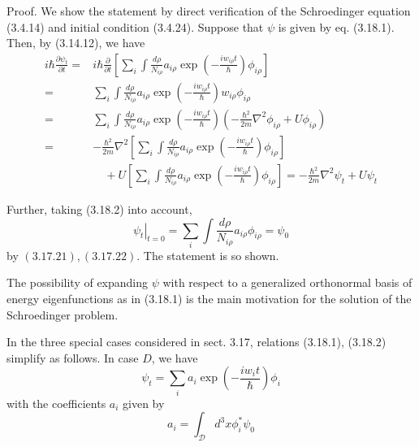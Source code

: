 \documentclass{article}
\begin{document}
Proof. We show the statement by direct verification of the Schroedinger equation (3.4.14) and initial condition (3.4.24). Suppose that $\psi$ is given by eq. (3.18.1). Then, by (3.14.12), we have
$$
\begin{align*}
i \hbar \frac{\partial \psi_{t}}{\partial t}= & i \hbar \frac{\partial}{\partial t}\left[\sum_{i} \int \frac{d \rho}{N_{i \rho}} a_{i \rho} \exp \left(-\frac{i w_{i \rho} t}{\hbar}\right) \phi_{i \rho}\right]  \tag{3.18.3}\\
= & \sum_{i} \int \frac{d \rho}{N_{i \rho}} a_{i \rho} \exp \left(-\frac{i w_{i \rho} t}{\hbar}\right) w_{i \rho} \phi_{i \rho} \\
= & \sum_{i} \int \frac{d \rho}{N_{i \rho}} a_{i \rho} \exp \left(-\frac{i w_{i \rho} t}{\hbar}\right)\left(-\frac{\hbar^{2}}{2 m} \nabla^{2} \phi_{i \rho}+U \phi_{i \rho}\right) \\
= & -\frac{\hbar^{2}}{2 m} \nabla^{2}\left[\sum_{i} \int \frac{d \rho}{N_{i \rho}} a_{i \rho} \exp \left(-\frac{i w_{i \rho} t}{\hbar}\right) \phi_{i \rho}\right] \\
& \quad+U\left[\sum_{i} \int \frac{d \rho}{N_{i \rho}} a_{i \rho} \exp \left(-\frac{i w_{i \rho} t}{\hbar}\right) \phi_{i \rho}\right]=-\frac{\hbar^{2}}{2 m} \nabla^{2} \psi_{t}+U \psi_{t}
\end{align*}
$$

Further, taking (3.18.2) into account,
$$
\begin{equation*}
\left.\psi_{t}\right|_{t=0}=\sum_{i} \int \frac{d \rho}{N_{i \rho}} a_{i \rho} \phi_{i \rho}=\psi_{0} \tag{3.18.4}
\end{equation*}
$$
by $(3.17 .21),(3.17 .22)$. The statement is so shown.

The possibility of expanding $\psi$ with respect to a generalized orthonormal basis of energy eigenfunctions as in (3.18.1) is the main motivation for the solution of the Schroedinger problem.

In the three special cases considered in sect. 3.17, relations (3.18.1), (3.18.2) simplify as follows. In case $D$, we have
$$
\begin{equation*}
\psi_{t}=\sum_{i} a_{i} \exp \left(-\frac{i w_{i} t}{\hbar}\right) \phi_{i} \tag{3.18.5}
\end{equation*}
$$
with the coefficients $a_{i}$ given by
$$
\begin{equation*}
a_{i}=\int_{\mathcal{D}} d^{3} x \phi_{i}^{*} \psi_{0} \tag{3.18.6}
\end{equation*}
$$
\end{document}
